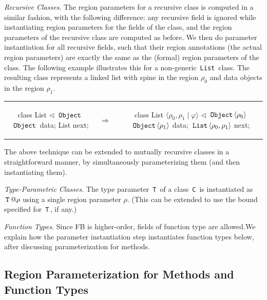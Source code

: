 \documentclass[a4paper,UKenglish]{lipics-v2018}
\newcommand{\C}[1]{\code{#1}}
\newcommand{\code}[1]{\,{\tt #1}\,}
\newcommand{\FB}{{\sc FB}\xspace}
\newcommand{\ObjZ}{\C{Object}}
\newcommand{\extends}{\triangleleft}
\begin{document}
\emph{Recursive Classes}.
The region parameters for a recursive class is computed in
a similar fashion, with the following difference: any recursive
field is ignored while instantiating region parameters for the fields of
the class, and the region parameters of the recursive class are computed
as before. We then do parameter instantiation for all recursive fields,
such that their region annotations (the actual region parameters) are
exactly the same as the (formal) region parameters of the class.
The following example illustrates this for a non-generic \C{List} class.
The resulting class represents a linked list with spine in the region
$\rho_0$ and data objects in the region $\rho_1$.

\begin{tabular}{ccc}
\begin{minipage}{0.33\linewidth}
\begin{codejava}
class List $\extends$ $\ObjZ$ {
  $\ObjZ$ data;
  List next;
}
\end{codejava}
\end{minipage}
&
$\Rightarrow \; \;$
&
\begin{minipage}{0.5\linewidth}
\begin{codejava}
class List $\langle \rho_0, \rho_1 \; | \; \varphi \rangle$ $\extends$ $\ObjZ \langle \rho_0 \rangle$ {
  $\ObjZ \langle \rho_1 \rangle$ data;
  $\C{List} \langle \rho_0, \rho_1 \rangle$ next;
}
\end{codejava}
\end{minipage}
\end{tabular}

The above technique can be extended to mutually recursive classes in a
straightforward manner, by simultaneously parameterizing them (and
then instantiating them).

\emph{Type-Parametric Classes}.  The type parameter \C{T} of a class
\C{C} is instantiated as $\C{T}@\rho$ using a single region parameter
$\rho$.  (This can be extended to use the bound specified for \C{T},
if any.)

\emph{Function Types}.  Since \FB{} is higher-order, fields of
function type are allowed.We explain how the parameter instantiation
step instantiates function types below, after discussing
parameterization for methods.

\subsection{Region Parameterization for Methods and Function Types}
\end{document}
